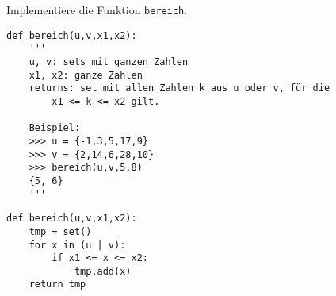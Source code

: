 \question[3] Implementiere die Funktion \texttt{bereich}.
\begin{lstlisting}
def bereich(u,v,x1,x2):
    '''
    u, v: sets mit ganzen Zahlen
    x1, x2: ganze Zahlen
    returns: set mit allen Zahlen k aus u oder v, für die
        x1 <= k <= x2 gilt.

    Beispiel:
    >>> u = {-1,3,5,17,9}
    >>> v = {2,14,6,28,10}
    >>> bereich(u,v,5,8)
    {5, 6}
    '''
\end{lstlisting}
\begin{solutionbox}{6cm}
\begin{lstlisting}
def bereich(u,v,x1,x2):
    tmp = set()
    for x in (u | v):
        if x1 <= x <= x2:
            tmp.add(x)
    return tmp
\end{lstlisting}
\end{solutionbox}
